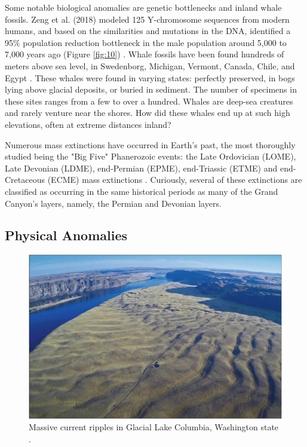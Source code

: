 \documentclass[10pt,twocolumn,letterpaper]{article}
\begin{document}
Some notable biological anomalies are genetic bottlenecks and inland whale fossils. Zeng et al. (2018) modeled 125 Y-chromosome sequences from modern humans, and based on the similarities and mutations in the DNA, identified a 95\% population reduction bottleneck in the male population around 5,000 to 7,000 years ago (Figure \ref{fig:10}) \cite{62}. Whale fossils have been found hundreds of meters above sea level, in Swedenborg, Michigan, Vermont, Canada, Chile, and Egypt \cite{63,64,65,66}. These whales were found in varying states: perfectly preserved, in bogs lying above glacial deposits, or buried in sediment. The number of specimens in these sites ranges from a few to over a hundred.  Whales are deep-sea creatures and rarely venture near the shores. How did these whales end up at such high elevations, often at extreme distances inland?

Numerous mass extinctions have occurred in Earth’s past, the most thoroughly studied being the "Big Five"  Phanerozoic events: the Late Ordovician (LOME), Late Devonian (LDME), end-Permian (EPME), end-Triassic (ETME) and end-Cretaceous (ECME) mass extinctions \cite{88,89}. Curiously, several of these extinctions are classified as occurring in the same historical periods as many of the Grand Canyon's layers, namely, the Permian and Devonian layers.

\subsection{Physical Anomalies}

\begin{figure}[b]
\begin{center}
   \includegraphics[width=1\linewidth]{columbia.jpg}
\end{center}
   \caption{Massive current ripples in Glacial Lake Columbia, Washington state \cite{80}.}
\label{fig:11}
\label{fig:onecol}
\end{figure}
\end{document}
